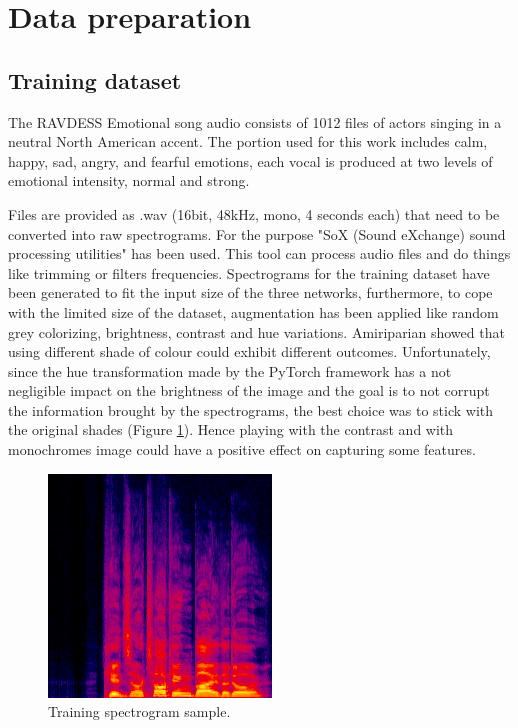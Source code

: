 \documentclass[10pt,twocolumn,letterpaper]{article}
\begin{document}
\section{Data preparation}\label{data-preparation}

\subsection{Training dataset}

The RAVDESS Emotional song audio consists of 1012 files of actors singing in a neutral North American accent. The portion used for this work includes calm, happy, sad, angry, and fearful emotions, each vocal is produced at two levels of emotional intensity, normal and strong.

Files are provided as .wav (16bit, 48kHz, mono, 4 seconds each) that need to be converted into raw spectrograms. For the purpose "SoX (Sound eXchange) sound processing utilities" has been used. This tool can process audio files and do things like trimming or filters frequencies. Spectrograms for the training dataset have been generated to fit the input size of the three networks, furthermore, to cope with the limited size of the dataset, augmentation has been applied like random grey colorizing, brightness, contrast and hue variations. Amiriparian \etal \cite{Amiriparian} showed that using different shade of colour could exhibit different outcomes. Unfortunately, since the hue transformation made by the PyTorch framework has a not negligible impact on the brightness of the image and the goal is to not corrupt the information brought by the spectrograms, the best choice was to stick with the original shades (Figure \ref{fig:training-sample}). Hence playing with the contrast and with monochromes image could have a positive effect on capturing some features.

\begin{figure}[ht]
   \begin{center}
   \includegraphics[width=0.8\linewidth]{img/happy_92.png}
   \end{center}
      \caption{Training spectrogram sample.}
   \label{fig:training-sample}
   \end{figure}
\end{document}
